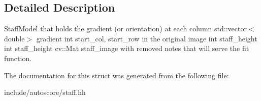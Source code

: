 \subsection{Detailed Description}
Staff\+Model that holds the gradient (or orientation) at each column  std\+::vector$<$double$>$ gradient  int start\+\_\+col, start\+\_\+row in the original image  int staff\+\_\+height  int staff\+\_\+height  cv\+::\+Mat staff\+\_\+image with removed notes that will serve the fit function. 

The documentation for this struct was generated from the following file\+:\begin{DoxyCompactItemize}
\item 
include/autoscore/staff.\+hh\end{DoxyCompactItemize}
